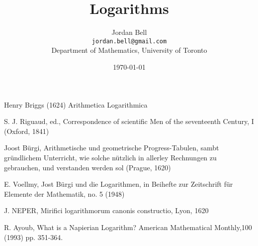 \documentclass{article}
\theoremstyle{definition}
\begin{document}
\title{Logarithms}
\author{Jordan Bell\\ \texttt{jordan.bell@gmail.com}\\Department of Mathematics, University of Toronto}
\date{\today}

\maketitle

Henry Briggs (1624) Arithmetica Logarithmica

S. J. Riguaud, ed., Correspondence of scientific Men of the seventeenth Century, I (Oxford, 1841)

Joost B\"urgi,
Arithmetische und geometrische Progress-Tabulen, sambt gr\"undlichem Unterricht, wie solche n\"utzlich in allerley Rechnungen zu gebrauchen, und verstanden werden sol (Prague, 1620)

E. Voellmy, Jost B\"urgi und die Logarithmen, in Beihefte zur Zeitschrift f\"ur Elemente der Mathematik, no. 5 (1948)

J. NEPER, Mirifici logarithmorum canonis constructio, Lyon, 1620

R. Ayoub, What is a Napierian Logarithm? American Mathematical Monthly,100 (1993) pp. 351-364.







\end{document}
